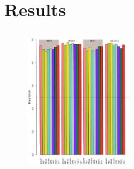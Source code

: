 \chapter{Results}



\section{}

\begin{figure}[H]
\centering\includegraphics[width=0.4\textwidth]{./Bilder/Precision.pdf}
\caption[Precision]{ }
\label{fig:}
\end{figure}


\section{}


\section{}

